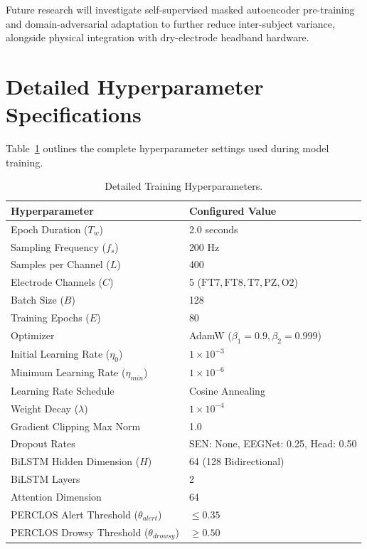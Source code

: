 \documentclass[conference]{IEEEtran}
\begin{document}
Future research will investigate self-supervised masked autoencoder pre-training and domain-adversarial adaptation to further reduce inter-subject variance, alongside physical integration with dry-electrode headband hardware.

\appendices
\section{Detailed Hyperparameter Specifications}
\label{app:hyperparams}
Table~\ref{tab:hyper_details} outlines the complete hyperparameter settings used during model training.

\begin{table}[t]
\caption{Detailed Training Hyperparameters.}
\label{tab:hyper_details}
\centering
\footnotesize
\setlength{\tabcolsep}{5pt}
\begin{tabular}{@{}lp{5.8cm}@{}}
\toprule
\textbf{Hyperparameter} & \textbf{Configured Value} \\
\midrule
Epoch Duration ($T_w$) & 2.0 seconds \\
Sampling Frequency ($f_s$) & 200 Hz \\
Samples per Channel ($L$) & 400 \\
Electrode Channels ($C$) & 5 ($\text{FT7}, \text{FT8}, \text{T7}, \text{PZ}, \text{O2}$) \\
Batch Size ($B$) & 128 \\
Training Epochs ($E$) & 80 \\
Optimizer & AdamW ($\beta_1=0.9, \beta_2=0.999$) \\
Initial Learning Rate ($\eta_0$) & $1 \times 10^{-3}$ \\
Minimum Learning Rate ($\eta_{min}$) & $1 \times 10^{-6}$ \\
Learning Rate Schedule & Cosine Annealing \\
Weight Decay ($\lambda$) & $1 \times 10^{-4}$ \\
Gradient Clipping Max Norm & 1.0 \\
Dropout Rates & SEN: None, EEGNet: 0.25, Head: 0.50 \\
BiLSTM Hidden Dimension ($H$) & 64 (128 Bidirectional) \\
BiLSTM Layers & 2 \\
Attention Dimension & 64 \\
PERCLOS Alert Threshold ($\theta_{alert}$) & $\le 0.35$ \\
PERCLOS Drowsy Threshold ($\theta_{drowsy}$) & $\ge 0.50$ \\
\bottomrule
\end{tabular}
\end{table}
\end{document}
